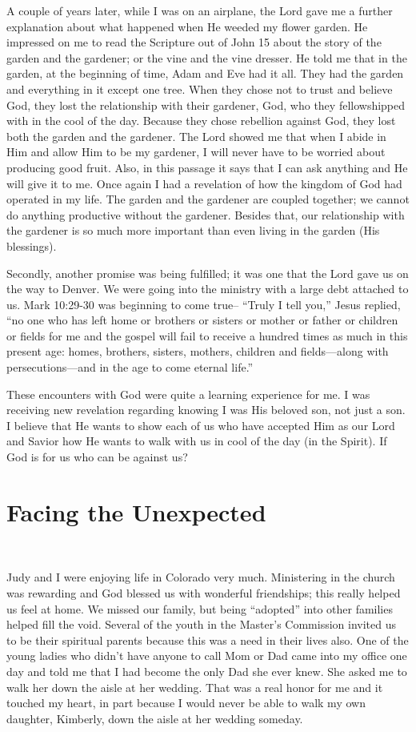 \documentclass[oneside]{book}
\begin{document}
A couple of years later, while I was on an airplane, the Lord gave me a further explanation about what happened when He weeded my flower garden. He impressed on me to read the Scripture out of John 15 about the story of the garden and the gardener; or the vine and the vine dresser. He told me that in the garden, at the beginning of time, Adam and Eve had it all. They had the garden and everything in it except one tree. When they chose not to trust and believe God, they lost the relationship with their gardener, God, who they fellowshipped with in the cool of the day. Because they chose rebellion against God, they lost both the garden and the gardener. The Lord showed me that when I abide in Him and allow Him to be my gardener, I will never have to be worried about producing good fruit. Also, in this passage it says that I can ask anything and He will give it to me. Once again I had a revelation of how the kingdom of God had operated in my life. The garden and the gardener are coupled together; we cannot do anything productive without the gardener. Besides that, our relationship with the gardener is so much more important than even  living in the garden (His blessings).

Secondly, another promise was being fulfilled; it was one that the Lord gave us on the way to Denver. We were going into the ministry with a large debt attached to us. Mark 10:29-30 was beginning to come true-- “Truly I tell you,” Jesus replied, “no one who has left home or brothers or sisters or mother or father or children or fields for me and the gospel will fail to receive a hundred times as much in this present age: homes, brothers, sisters, mothers, children and fields—along with persecutions—and in the age to come eternal life.”

These encounters with God were quite a learning experience for me. I was receiving new revelation regarding knowing I was His beloved son, not just a son. I believe that He wants to show each of us who have accepted Him as our Lord and Savior how He wants to walk with us in cool of the day (in the Spirit). If God is for us who can be against us?


\chapter{Facing the Unexpected}
\

Judy and I were enjoying life in Colorado very much. Ministering in the church was rewarding and God blessed us with wonderful friendships; this really helped us feel at home. We missed our family, but being “adopted” into other families helped fill the void. Several of the youth in the Master’s Commission invited us to be their spiritual parents because this was a need in their lives also. One of the young ladies who didn’t have anyone to call Mom or Dad came into my office one day and told me that I had become the only Dad she ever knew. She asked me to walk her down the aisle at her wedding. That was a real honor for me and it touched my heart, in part because I would never be able to walk my own daughter, Kimberly, down the aisle at her wedding someday.
\end{document}
